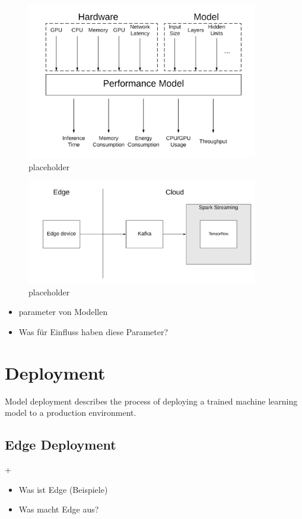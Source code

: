 \begin{figure}[H]
\centering
\includegraphics[width=0.9\textwidth]{./Bilder/trade_offs.png}
\caption{placeholder}
\label{fig:trade_offs}
\end{figure}
\begin{figure}[H]
\centering
\includegraphics[width=0.9\textwidth]{./Bilder/spark_stream.png}
\caption{placeholder}
\label{fig:trade}
\end{figure}
\begin{itemize}
    \item parameter von Modellen
    \item Was für Einfluss haben diese Parameter?
\end{itemize}
\section{Deployment}
Model deployment describes the process of deploying a trained machine learning model to a production environment.
\subsection{Edge Deployment}+
\begin{itemize}
    \item Was ist Edge (Beispiele)
    \item Was macht Edge aus?
\end{itemize}
